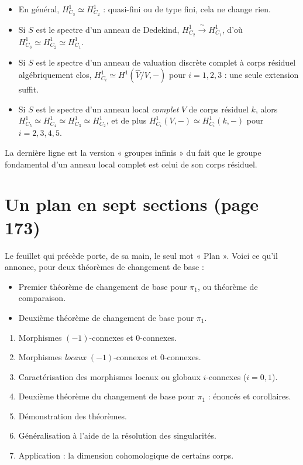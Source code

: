 \documentclass[11pt,a4paper]{article}
\begin{document}
\begin{itemize}
  \item En général, $H^{1}_{C_{3}} \simeq H^{1}_{C_{2}}$ : quasi-fini ou de
    type fini, cela ne change rien.
  \item Si $S$ est le spectre d'un anneau de Dedekind,
    $H^{1}_{C_{2}} \xrightarrow{\ \sim\ } H^{1}_{C_{1}}$, d'où
    $H^{1}_{C_{3}} \simeq H^{1}_{C_{2}} \simeq H^{1}_{C_{1}}$.
  \item Si $S$ est le spectre d'un anneau de valuation discrète complet à corps
    résiduel algébriquement clos, $H^{1}_{C_{i}} \simeq H^{1}(\hat{V}/V, -)$
    pour $i = 1, 2, 3$ : une seule extension suffit.
  \item Si $S$ est le spectre d'un anneau local \emph{complet} $V$ de corps
    résiduel $k$, alors $H^{1}_{C_{5}} \simeq H^{1}_{C_{4}} \simeq
    H^{1}_{C_{3}} \simeq H^{1}_{C_{2}}$, et de plus
    $H^{1}_{C_{i}}(V, -) \simeq H^{1}_{C_{i}}(k, -)$ pour $i = 2,3,4,5$.
\end{itemize}

La dernière ligne est la version « groupes infinis » du fait que le groupe
fondamental d'un anneau local complet est celui de son corps résiduel.

\section*{Un plan en sept sections (page 173)}

Le feuillet qui précède porte, de sa main, le seul mot « Plan ». Voici ce qu'il
annonce, pour deux théorèmes de changement de base :

\begin{itemize}
  \item[I] Premier théorème de changement de base pour $\pi_{1}$, ou théorème
    de comparaison.
  \item[II] Deuxième théorème de changement de base pour $\pi_{1}$.
\end{itemize}

\begin{enumerate}
  \item Morphismes $(-1)$-connexes et $0$-connexes.
  \item Morphismes \emph{locaux} $(-1)$-connexes et $0$-connexes.
  \item Caractérisation des morphismes locaux ou globaux $i$-connexes
    ($i = 0, 1$).
  \item Deuxième théorème du changement de base pour $\pi_{1}$ : énoncés et
    corollaires.
  \item Démonstration des théorèmes.
  \item Généralisation à l'aide de la résolution des singularités.
  \item Application : la dimension cohomologique de certains corps.
\end{enumerate}
\end{document}
